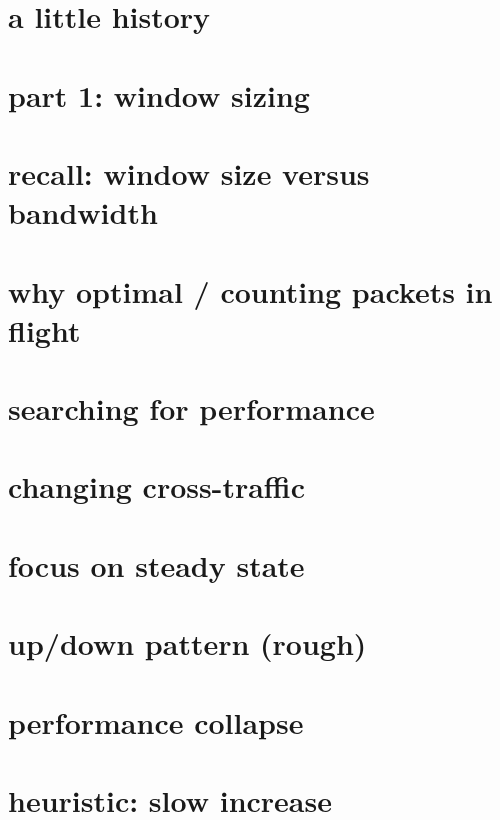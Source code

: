 
\section{a little history}


\section{part 1: window sizing}

\section{recall: window size versus bandwidth}


\section{why optimal / counting packets in flight}


\section{searching for performance}


\section{changing cross-traffic}


\section{focus on steady state}


\section{up/down pattern (rough)}


\section{performance collapse}


\section{heuristic: slow increase}


